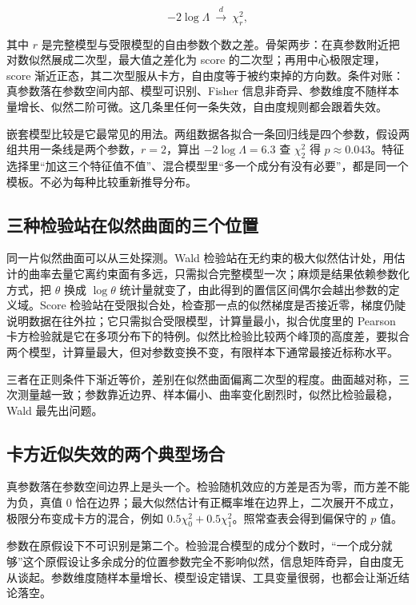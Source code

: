 \[
-2\log\Lambda\ \overset{d}{\longrightarrow}\ \chi^{2}_{r},
\]

其中 \(r\) 是完整模型与受限模型的自由参数个数之差。骨架两步：在真参数附近把对数似然展成二次型，最大值之差化为 score 的二次型；再用中心极限定理，score 渐近正态，其二次型服从卡方，自由度等于被约束掉的方向数。条件对账：真参数落在参数空间内部、模型可识别、Fisher 信息非奇异、参数维度不随样本量增长、似然二阶可微。这几条里任何一条失效，自由度规则都会跟着失效。

嵌套模型比较是它最常见的用法。两组数据各拟合一条回归线是四个参数，假设两组共用一条线是两个参数，\(r=2\)，算出 \(-2\log\Lambda=6.3\) 查 \(\chi^{2}_{2}\) 得 \(p\approx 0.043\)。特征选择里``加这三个特征值不值''、混合模型里``多一个成分有没有必要''，都是同一个模板。不必为每种比较重新推导分布。

\subsection{三种检验站在似然曲面的三个位置}

同一片似然曲面可以从三处探测。Wald 检验站在无约束的极大似然估计处，用估计的曲率去量它离约束面有多远，只需拟合完整模型一次；麻烦是结果依赖参数化方式，把 \(\theta\) 换成 \(\log\theta\) 统计量就变了，由此得到的置信区间偶尔会越出参数的定义域。Score 检验站在受限拟合处，检查那一点的似然梯度是否接近零，梯度仍陡说明数据在往外拉；它只需拟合受限模型，计算量最小，拟合优度里的 Pearson 卡方检验就是它在多项分布下的特例。似然比检验比较两个峰顶的高度差，要拟合两个模型，计算量最大，但对参数变换不变，有限样本下通常最接近标称水平。

三者在正则条件下渐近等价，差别在似然曲面偏离二次型的程度。曲面越对称，三次测量越一致；参数靠近边界、样本偏小、曲率变化剧烈时，似然比检验最稳，Wald 最先出问题。

\subsection{卡方近似失效的两个典型场合}

真参数落在参数空间边界上是头一个。检验随机效应的方差是否为零，而方差不能为负，真值 \(0\) 恰在边界；最大似然估计有正概率堆在边界上，二次展开不成立，极限分布变成卡方的混合，例如 \(0.5\chi^{2}_{0}+0.5\chi^{2}_{1}\)。照常查表会得到偏保守的 \(p\) 值。

参数在原假设下不可识别是第二个。检验混合模型的成分个数时，``一个成分就够''这个原假设让多余成分的位置参数完全不影响似然，信息矩阵奇异，自由度无从谈起。参数维度随样本量增长、模型设定错误、工具变量很弱，也都会让渐近结论落空。

